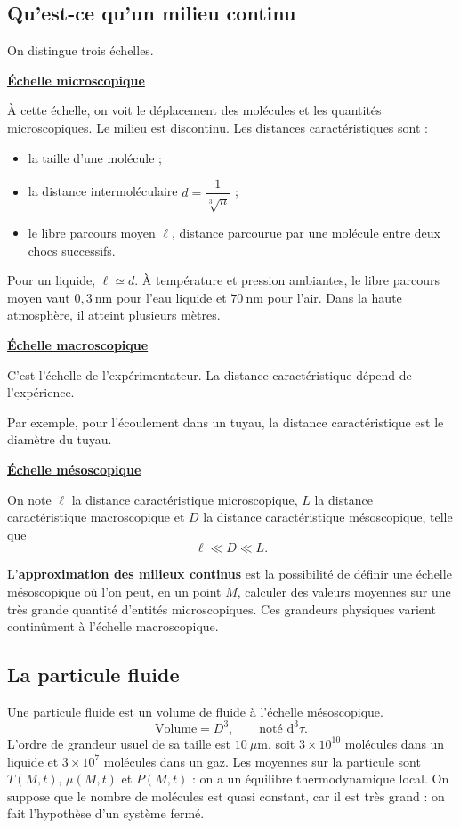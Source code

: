 \documentclass[11pt,a4paper]{article}
\newcommand{\dd}{\mathrm d}
\newcommand{\titr}[1]{\par\needspace{4\baselineskip}\textbf{\underline{#1}}\par}
\begin{document}
\subsection{Qu'est-ce qu'un milieu continu}
On distingue trois échelles.
\titr{Échelle microscopique}
À cette échelle, on voit le déplacement des molécules et les quantités microscopiques. Le milieu est discontinu. Les distances caractéristiques sont :
\begin{itemize}
\item la taille d'une molécule ;
\item la distance intermoléculaire $d=\dfrac1{\sqrt[3]{n}}$ ;
\item le libre parcours moyen $\ell$, distance parcourue par une molécule entre deux chocs successifs.
\end{itemize}
Pour un liquide, $\ell\simeq d$. À température et pression ambiantes, le libre parcours moyen vaut $0{,}3\ \mathrm{nm}$ pour l'eau liquide et $70\ \mathrm{nm}$ pour l'air. Dans la haute atmosphère, il atteint plusieurs mètres.
\titr{Échelle macroscopique}
C'est l'échelle de l'expérimentateur. La distance caractéristique dépend de l'expérience. \begin{exemple}
Par exemple, pour l'écoulement dans un tuyau, la distance caractéristique est le diamètre du tuyau.
\end{exemple}
\titr{Échelle mésoscopique}
On note $\ell$ la distance caractéristique microscopique, $L$ la distance caractéristique macroscopique et $D$ la distance caractéristique mésoscopique, telle que
\[\ell\ll D\ll L.\]
\begin{cadre}
L'\textbf{approximation des milieux continus} est la possibilité de définir une échelle mésoscopique où l'on peut, en un point $M$, calculer des valeurs moyennes sur une très grande quantité d'entités microscopiques. Ces grandeurs physiques varient continûment à l'échelle macroscopique.
\end{cadre}
\subsection{La particule fluide}
Une particule fluide est un volume de fluide à l'échelle mésoscopique.
\[\text{Volume}=D^3,\qquad\text{noté }\dd^3\tau.\]
L'ordre de grandeur usuel de sa taille est $10\ \mu\mathrm m$, soit $3\times10^{10}$ molécules dans un liquide et $3\times10^7$ molécules dans un gaz.
Les moyennes sur la particule sont $T(M,t)$, $\mu(M,t)$ et $P(M,t)$ : on a un équilibre thermodynamique local.
On suppose que le nombre de molécules est quasi constant, car il est très grand : on fait l'hypothèse d'un système fermé.
\end{document}
